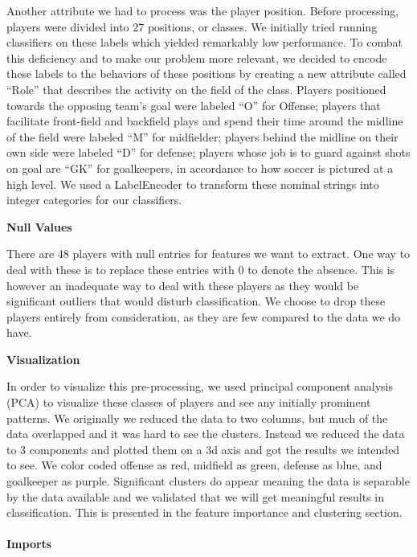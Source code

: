 \documentclass[11pt]{article}
\begin{document}
Another attribute we had to process was the player position. Before
processing, players were divided into 27 positions, or classes. We
initially tried running classifiers on these labels which yielded
remarkably low performance. To combat this deficiency and to make our
problem more relevant, we decided to encode these labels to the
behaviors of these positions by creating a new attribute called ``Role''
that describes the activity on the field of the class. Players
positioned towards the opposing team's goal were labeled ``O'' for
Offense; players that facilitate front-field and backfield plays and
spend their time around the midline of the field were labeled ``M'' for
midfielder; players behind the midline on their own side were labeled
``D'' for defense; players whose job is to guard against shots on goal
are ``GK'' for goalkeepers, in accordance to how soccer is pictured at a
high level. We used a LabelEncoder to transform these nominal strings
into integer categories for our classifiers.

\textbf{Null Values}

There are 48 players with null entries for features we want to extract.
One way to deal with these is to replace these entries with 0 to denote
the absence. This is however an inadequate way to deal with these
players as they would be significant outliers that would disturb
classification. We choose to drop these players entirely from
consideration, as they are few compared to the data we do have.

\textbf{Visualization}

In order to visualize this pre-processing, we used principal component
analysis (PCA) to visualize these classes of players and see any
initially prominent patterns. We originally we reduced the data to two
columns, but much of the data overlapped and it was hard to see the
clusters. Instead we reduced the data to 3 components and plotted them
on a 3d axis and got the results we intended to see. We color coded
offense as red, midfield as green, defense as blue, and goalkeeper as
purple. Significant clusters do appear meaning the data is separable by
the data available and we validated that we will get meaningful results
in classification. This is presented in the feature importance and
clustering section.

    \hypertarget{imports}{%
\paragraph{Imports}\label{imports}}
\end{document}
